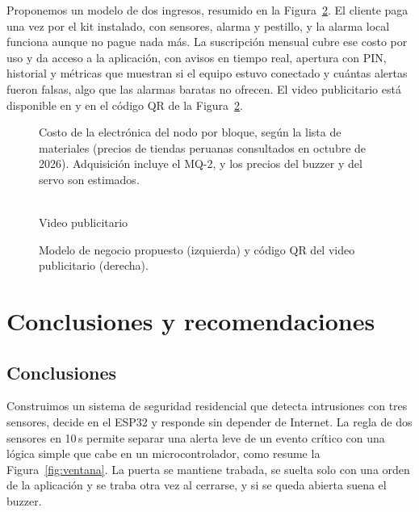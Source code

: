 \documentclass[manuscript,screen,nonacm]{acmart}
\def\videourl{}
\begin{document}
Proponemos un modelo de dos ingresos, resumido en la Figura~\ref{fig:mercado}. El cliente paga una vez por el kit instalado, con sensores, alarma y pestillo, y la alarma local funciona aunque no pague nada más. La suscripción mensual cubre ese costo por uso y da acceso a la aplicación, con avisos en tiempo real, apertura con PIN, historial y métricas que muestran si el equipo estuvo conectado y cuántas alertas fueron falsas, algo que las alarmas baratas no ofrecen. \ifx\videourl\empty\else El video publicitario está disponible en \url{\videourl} y en el código QR de la Figura~\ref{fig:mercado}.\fi

\begin{figure}[htbp]
\centering

\caption{Costo de la electrónica del nodo por bloque, según la lista de materiales (precios de tiendas peruanas consultados en octubre de 2026). Adquisición incluye el MQ-2, y los precios del buzzer y del servo son estimados.}
\label{fig:costos}
\end{figure}

\begin{figure}[htbp]
\centering
\ifx\videourl\empty
{}
\caption{Modelo de negocio propuesto.}
\else
\begin{minipage}[c]{0.78\linewidth}\centering
{}
\end{minipage}\hfill
\begin{minipage}[c]{0.18\linewidth}\centering
\qrcode[height=2.2cm]{\videourl}\\[1mm]
{\scriptsize Video publicitario}
\end{minipage}
\caption{Modelo de negocio propuesto (izquierda) y código QR del video publicitario (derecha).}
\fi
\label{fig:mercado}
\end{figure}

\section{Conclusiones y recomendaciones}
\label{sec:conclusiones}

\subsection{Conclusiones}
Construimos un sistema de seguridad residencial que detecta intrusiones con tres sensores, decide en el ESP32 y responde sin depender de Internet. La regla de dos sensores en 10\,s permite separar una alerta leve de un evento crítico con una lógica simple que cabe en un microcontrolador, como resume la Figura~\ref{fig:ventana}. La puerta se mantiene trabada, se suelta solo con una orden de la aplicación y se traba otra vez al cerrarse, y si se queda abierta suena el buzzer.
\end{document}
